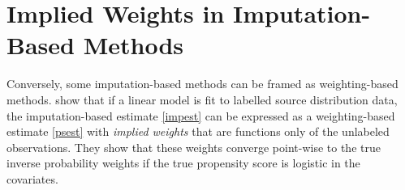 \documentclass{article} %
\begin{document}

\section{Implied Weights in Imputation-Based Methods}
Conversely, some imputation-based methods can be framed as weighting-based methods. \cite{chattopadhyay2021implied} show that if a linear model is fit to labelled source distribution data, the imputation-based estimate \ref{impest} can be expressed as a weighting-based estimate \ref{psest} with \emph{implied weights} that are functions only of the unlabeled observations. They show that these weights converge point-wise to the true inverse probability weights if the true propensity score is logistic in the covariates.








\end{document}
